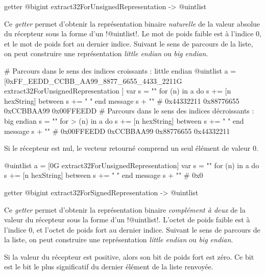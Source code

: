 
\begin{galgas}
getter @bigint extract32ForUnsignedRepresentation -> @uintlist
\end{galgas}

Ce \emph{getter} permet d'obtenir la représentation binaire \emph{naturelle} de la valeur absolue du récepteur sous la forme d'un \ggs!@uintlist!. Le mot de poids faible est à l'indice $0$, et le mot de poids fort au dernier indice. Suivant le sens de parcours de la liste, on peut construire une représentation \emph{little endian} ou \emph{big endian}.

\begin{galgas}
# Parcours dans le sens des indices croissants : little endian
@uintlist a = [0xFF_EEDD_CCBB_AA99_8877_6655_4433_2211G
  extract32ForUnsignedRepresentation
]
var s = ""
for (n) in a
  do s += [n hexString]
  between s += " "
end
message s + "\n" # 0x44332211 0x88776655 0xCCBBAA99 0x00FFEEDD 
# Parcours dans le sens des indices décroissants : big endian
s = ""
for > (n) in a
  do s += [n hexString]
  between s += " "
end
message s + "\n" # 0x00FFEEDD 0xCCBBAA99 0x88776655 0x44332211
\end{galgas}

Si le récepteur est nul, le vecteur retourné comprend un seul élément de valeur $0$.

\begin{galgas}
@uintlist a = [0G extract32ForUnsignedRepresentation]
var s = ""
for (n) in a
  do s += [n hexString]
  between s += " "
end
message s + "\n" # 0x0
\end{galgas}





\begin{galgas}
getter @bigint extract32ForSignedRepresentation -> @uintlist
\end{galgas}

Ce \emph{getter} permet d'obtenir la représentation binaire \emph{complément à deux} de la valeur du récepteur sous la forme d'un \ggs!@uintlist!. L'octet de poids faible est à l'indice $0$, et l'octet de poids fort au dernier indice. Suivant le sens de parcours de la liste, on peut construire une représentation \emph{little endian} ou \emph{big endian}.

Si la valeur du récepteur est positive, alors son bit de poids fort est zéro. Ce bit est le bit le plus significatif du dernier élément de la liste renvoyée.


